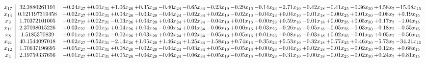 \documentclass[9pt]{article}
\begin{document}
 \[\begin{array}{c| c c@{\hskip 2pt} c@{\hskip 2pt} c@{\hskip 2pt} c@{\hskip 2pt} c@{\hskip 2pt} c@{\hskip 2pt} c@{\hskip 2pt} c@{\hskip 2pt} c@{\hskip 2pt} c@{\hskip 2pt} c@{\hskip 2pt} c@{\hskip 2pt} c@{\hskip 2pt} c@{\hskip 2pt} c@{\hskip 2pt} }
 x_{17}   &  32.3880261191 & -0.24 x_{27} & +  0.00 x_{31} & +  1.06 x_{26} & +  0.35 x_{29} & -0.40 x_{24} & -0.65 x_{34} & -0.23 x_{19} & -0.29 x_{16} & -0.14 x_{23} & -2.71 x_{10} & -0.42 x_{18} & -0.41 x_{25} & -0.36 x_{30} & +  4.58 x_{7} & -15.08 x_{15}\\
 x_{14}   &  0.121197319458 & -0.02 x_{27} & +  0.00 x_{31} & +  0.04 x_{26} & -0.03 x_{29} & -0.04 x_{24} & -0.02 x_{34} & +  0.02 x_{19} & -0.02 x_{16} & -0.04 x_{23} & +  0.04 x_{10} & -0.01 x_{18} & -0.00 x_{25} & +  0.01 x_{30} & -0.08 x_{7} & +  0.19 x_{15}\\
 x_{3}   &  1.70372101005 & -0.02 x_{27} & +  0.02 x_{31} & -0.03 x_{26} & +  0.04 x_{29} & +  0.03 x_{24} & +  0.02 x_{34} & -0.04 x_{19} & +  0.01 x_{16} & -0.00 x_{23} & +  0.59 x_{10} & -0.01 x_{18} & +  0.00 x_{25} & +  0.05 x_{30} & +  0.17 x_{7} & -1.04 x_{15}\\
 x_{11}   &  2.37098015226 & +  0.03 x_{27} & -0.00 x_{31} & +  0.04 x_{26} & +  0.04 x_{29} & -0.00 x_{24} & +  0.01 x_{34} & -0.06 x_{19} & +  0.00 x_{16} & +  0.03 x_{23} & -0.26 x_{10} & -0.05 x_{18} & -0.05 x_{25} & -0.03 x_{30} & -0.18 x_{7} & -0.55 x_{15}\\
 x_{8}   &  1.5185370839 & +  0.01 x_{27} & +  0.02 x_{31} & -0.02 x_{26} & +  0.03 x_{29} & +  0.02 x_{24} & +  0.02 x_{34} & -0.05 x_{19} & +  0.05 x_{16} & +  0.01 x_{23} & -0.08 x_{10} & -0.03 x_{18} & +  0.02 x_{25} & -0.01 x_{30} & +  0.05 x_{7} & -0.56 x_{15}\\
 x_{21}   &  40.1544097018 & +  0.62 x_{27} & -0.52 x_{31} & -2.14 x_{26} & +  1.05 x_{29} & +  1.46 x_{24} & +  1.25 x_{34} & -1.58 x_{19} & +  0.74 x_{16} & -0.35 x_{23} & +  5.53 x_{10} & -0.32 x_{18} & +  0.77 x_{25} & +  0.46 x_{30} & -5.73 x_{7} & -34.21 x_{15}\\
 x_{12}   &  1.70637196695 & -0.05 x_{27} & -0.00 x_{31} & +  0.08 x_{26} & -0.02 x_{29} & -0.04 x_{24} & -0.03 x_{34} & +  0.05 x_{19} & -0.05 x_{16} & +  0.00 x_{23} & -0.04 x_{10} & +  0.02 x_{18} & -0.01 x_{25} & -0.02 x_{30} & +  0.12 x_{7} & +  0.68 x_{15}\\
 x_{4}   &  2.19759337656 & -0.01 x_{27} & +  0.01 x_{31} & +  0.05 x_{26} & -0.04 x_{29} & -0.06 x_{24} & -0.06 x_{34} & +  0.05 x_{19} & -0.05 x_{16} & -0.00 x_{23} & -0.31 x_{10} & -0.00 x_{18} & -0.01 x_{25} & -0.02 x_{30} & +  0.24 x_{7} & +  0.81 x_{15}\\

\end{array}\]
\end{document}
